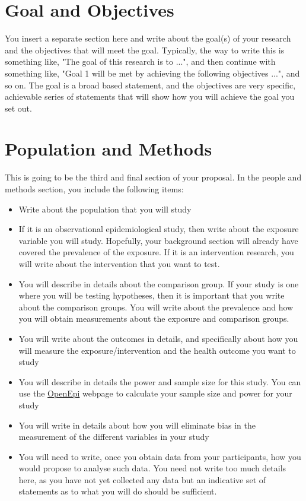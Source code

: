 \section*{Goal and Objectives}

You insert a separate section here and write about the goal(s) of your research and the objectives that will meet the goal. Typically, the way to write this is something like, "The goal of this research is to ...", and then continue with something like, "Goal 1 will be met by achieving the following objectives ...", and so on. The goal is a broad based statement, and the objectives are very specific, achievable series of statements that will show how you will achieve the goal you set out. 

\section*{Population and Methods}

This is going to be the third and final section of your proposal. In the people and methods section, you include the following items:

\begin{itemize}
\item Write about the population that you will study
\item If it is an observational epidemiological study, then write about the exposure variable you will study. Hopefully, your background section will already have covered the prevalence of the exposure. If it is an intervention research, you will write about the intervention that you want to test.
\item You will describe in details about the comparison group. If your study is one where you will be testing hypotheses, then it is important that you write about the comparison groups. You will write about the prevalence and how you will obtain measurements about the exposure and comparison groups.
\item You will write about the outcomes in details, and specifically about how you will measure the exposure/intervention and the health outcome you want to study
\item You will describe in details the power and sample size for this study. You can use the \href{http://www.openepi.com/Menu/OE_Menu.htm}{OpenEpi} webpage to calculate your sample size and power for your study
\item You will write in details about how you will eliminate bias in the measurement of the different variables in your study
\item You will need to write, once you obtain data from your participants, how you would propose to analyse such data. You need not write too much details here, as you have not yet collected any data but an indicative set of statements as to what you will do should be sufficient. 
\end{itemize}

